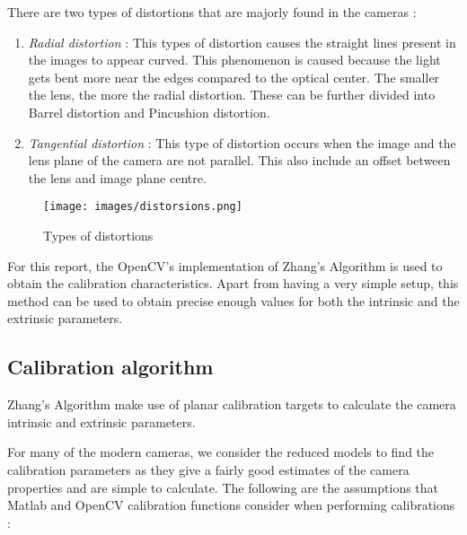 \bigbreak
There are two types of distortions that are majorly found in the cameras :
\begin{enumerate}
	\item \textit{Radial distortion} : This types of distortion causes the straight lines present in the images to appear curved. This phenomenon is caused because the light gets bent more near the edges compared to the optical center. The smaller the lens, the more the radial distortion. These can be further divided into Barrel distortion and Pincushion distortion.
	
	\item \textit{Tangential distortion} : This type of distortion occurs when the image and the lens plane of the camera are not parallel. This also include an offset between the lens and image plane centre.
\end{enumerate}

\begin{figure}[!h]
	\texttt{[image: images/distorsions.png]}
	\centering
	\caption{\small{Types of distortions\cite{Depth}}} 
	\label{fig:picture}
\end{figure}

\bigbreak
For this report, the OpenCV's implementation of Zhang's Algorithm is used to obtain the calibration characteristics. Apart from having a very simple setup, this method can be used to obtain precise enough values for both the intrinsic and the extrinsic parameters.

\subsection{Calibration algorithm}
Zhang's Algorithm make use of planar calibration targets to calculate the camera intrinsic and extrinsic parameters. 

\bigbreak
For many of the modern cameras, we consider the reduced models to find the calibration parameters as they give a fairly good estimates of the camera properties and are simple to calculate. The following are the assumptions that Matlab and OpenCV calibration functions consider when performing calibrations :

